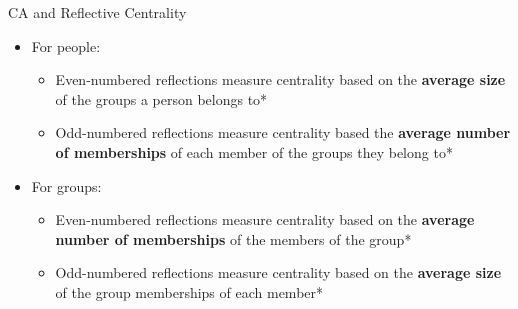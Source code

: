 \documentclass[
  ignorenonframetext,
]{beamer}
\providecommand{\tightlist}{%
  \setlength{\itemsep}{0pt}\setlength{\parskip}{0pt}}\usepackage{longtable,booktabs,array}
\begin{document}
\begin{frame}{CA and Reflective Centrality}
\protect\hypertarget{ca-and-reflective-centrality-6}{}
\begin{itemize}
\tightlist
\item
  For people:

  \begin{itemize}
  \tightlist
  \item
    Even-numbered reflections measure centrality based on the
    \textbf{average size} of the groups a person belongs to*
  \item
    Odd-numbered reflections measure centrality based the
    \textbf{average number of memberships} of each member of the groups
    they belong to*
  \end{itemize}
\end{itemize}

\pause

\begin{itemize}
\tightlist
\item
  For groups:

  \begin{itemize}
  \tightlist
  \item
    Even-numbered reflections measure centrality based on the
    \textbf{average number of memberships} of the members of the group*
  \item
    Odd-numbered reflections measure centrality based on the
    \textbf{average size} of the group memberships of each member*
  \end{itemize}
\end{itemize}

\end{frame}
\end{document}
